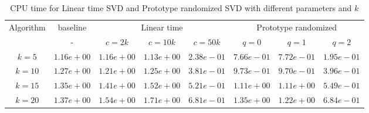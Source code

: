 \begin{table}\label{time22}
\centering
\begin{tabular}{|c|c|c|c|c|c|c|c|}

\hline
\multirow{2}{*}{ Algorithm} &\multicolumn{1}{c|}{baseline} &\multicolumn{3}{c|}{Linear time} &\multicolumn{3}{c|}{Prototype randomized}\\\cline{2-8}
 &- &$c=2k$ &$c=10k$ &$c=50k$ &$q=0$ &$q=1$ &$q=2$\\\hline
$k=5$ & $1.16e+00$ & $1.16e+00$ & $1.13e+00$ & $2.38e-01$ & $7.66e-01$ & $7.72e-01$ & $1.95e-01$\\\hline
$k=10$ & $1.27e+00$ & $1.21e+00$ & $1.25e+00$ & $3.81e-01$ & $9.73e-01$ & $9.70e-01$ & $3.96e-01$\\\hline
$k=15$ & $1.35e+00$ & $1.41e+00$ & $1.52e+00$ & $5.21e-01$ & $1.11e+00$ & $1.11e+00$ & $5.49e-01$\\\hline
$k=20$ & $1.37e+00$ & $1.54e+00$ & $1.71e+00$ & $6.81e-01$ & $1.35e+00$ & $1.22e+00$ & $6.84e-01$\\\hline
\end{tabular}
\caption{CPU time for Linear time SVD and Prototype randomized SVD with different parameters and $k$}
\end{table}
